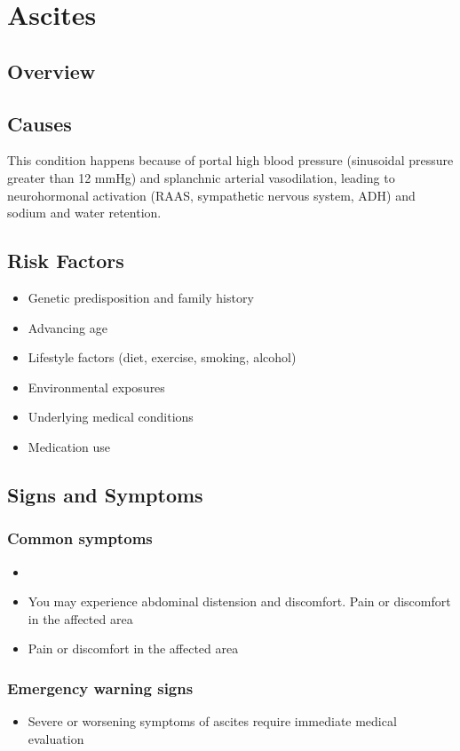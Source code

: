 \chapter{Ascites}
\label{sec:Ascites}

\section{Overview}

\section{Causes}
This condition happens because of portal high blood pressure (sinusoidal pressure greater than 12 mmHg) and splanchnic arterial vasodilation, leading to neurohormonal activation (RAAS, sympathetic nervous system, ADH) and sodium and water retention.     
\section{Risk Factors}

\begin{itemize}[noitemsep]
  \item Genetic predisposition and family history
  \item Advancing age
  \item Lifestyle factors (diet, exercise, smoking, alcohol)
  \item Environmental exposures
  \item Underlying medical conditions
  \item Medication use
\end{itemize}
\section{Signs and Symptoms}

\subsection{Common symptoms}
\begin{itemize}[noitemsep]
  \item \item You may experience abdominal distension and discomfort. Pain or discomfort in the affected area    \item Pain or discomfort in the affected area
  \end{itemize}

\subsection{Emergency warning signs}
\begin{itemize}[noitemsep]
  \item Severe or worsening symptoms of ascites require immediate medical evaluation
\end{itemize}
